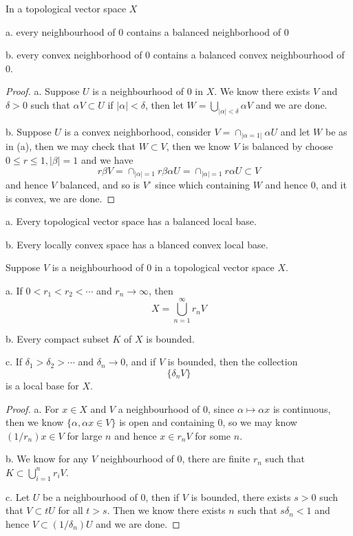 \begin{theorem}
    In a topological vector space $X$\par
    a. every neighbourhood of $0$ contains a balanced neighborhood of $0$\par
    b. every convex neighborhood of $0$ contains a balanced convex neighbourhood of $0$.
\end{theorem}
\begin{proof}
    a. Suppose $U$ is a neighbourhood of $0$ in $X$. We know there exists $V$ and $\delta > 0$ such that $\alpha V\subset U$ if $|\alpha| < \delta$, then let $W = \bigcup_{|\alpha| <\delta} \alpha V$ and we are done.\par
    b. Suppose $U$ is a convex neighborhood, consider $V = \cap_{|\alpha = 1|}\alpha U$ and let $W$ be as in (a), then we may check that $W\subset V$, then we know $V$ is balanced by choose $0\leq r \leq 1,|\beta| = 1$ and we have
    \[
    r\beta V = \cap_{|\alpha| = 1} r\beta \alpha U = \cap_{|\alpha| = 1}r\alpha U \subset V 
    \]
    and hence $V$ balanced, and so is $V^{\circ}$ since which containing $W$ and hence $0$, and it is convex, we are done.
\end{proof}

\begin{corollary}
    a. Every topological vector space has a balanced local base.\par
    b. Every locally convex space has a blanced convex local base.
\end{corollary}

\begin{theorem}
    Suppose $V$ is a neighbourhood of $0$ in a topological vector space $X$.\par
    a. If $0 < r_1<r_2<\cdots$ and $r_n \to \infty$, then
    \[X = \bigcup_{n=1}^{\infty} r_n V\]\par
    b. Every compact subset $K$ of $X$ is bounded.\par
    c. If $\delta_1>\delta_2>\cdots$ and $\delta_n \to 0$, and if $V$ is bounded, then the collection
    \[\{\delta_n V\}\]
    is a local base for $X$.
\end{theorem}
\begin{proof}
    a. For $x\in X$ and $V$ a neighbourhood of $0$, since $\alpha \mapsto \alpha x$ is continuous, then we know $\{\alpha, \alpha x \in V\}$ is open and containing $0$, so we may know $(1/r_n)x \in V$ for large $n$ and hence $x\in r_n V$ for some $n$.\par
    b. We know for any $V$ neighbourhood of $0$, there are finite $r_n$ such that $K \subset \bigcup_{i=1}^n r_i V$.\par
    c. Let $U$ be a neighbourhood of $0$, then if $V$ is bounded, there exists $s>0$ such that $V\subset tU$ for all $t>s$. Then we know there exists $n$ such that $s\delta_n < 1$ and hence $V\subset (1/\delta_n) U$ and we are done.
\end{proof}

